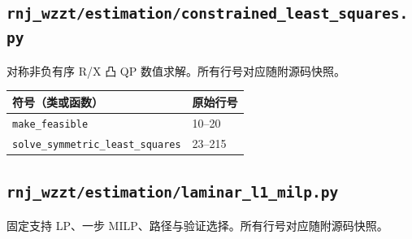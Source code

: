 \subsection{\texorpdfstring{\nolinkurl{rnj_wzzt/estimation/constrained_least_squares.py}}{rnj\_wzzt/estimation/constrained\_least\_squares.py}}\label{module:estimation.constrained_least_squares}
对称非负有序 R/X 凸 QP 数值求解。所有行号对应随附源码快照。
\begin{longtable}{P{0.73\textwidth}P{0.18\textwidth}}\toprule 符号（类或函数） & 原始行号\\\midrule\endhead
\nolinkurl{make_feasible} & 10--20 \\
\nolinkurl{solve_symmetric_least_squares} & 23--215 \\
\bottomrule\end{longtable}
\subsection{\texorpdfstring{\nolinkurl{rnj_wzzt/estimation/laminar_l1_milp.py}}{rnj\_wzzt/estimation/laminar\_l1\_milp.py}}\label{module:estimation.laminar_l1_milp}
固定支持 LP、一步 MILP、路径与验证选择。所有行号对应随附源码快照。
